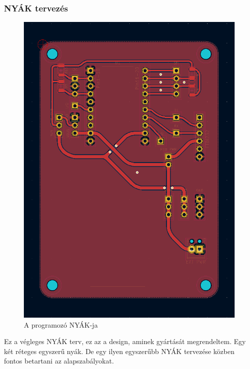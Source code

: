 \documentclass[a4paper,12pt,oneside]{book}
\begin{document}
\subsubsection{NYÁK tervezés}
\begin{figure}[H]
	\centering
	\includegraphics[trim=1mm 1mm 1mm 1mm,scale=0.45]{nyak.PNG}
	\caption{A programozó NYÁK-ja}
	\label{A programozó NYÁK-ja}
\end{figure}
Ez a végleges NYÁK terv, ez az a design, aminek gyártását megrendeltem. Egy két réteges egyszerű nyák. De egy ilyen egyszerűbb NYÁK tervezése közben fontos betartani az alapszabályokat.
\end{document}
